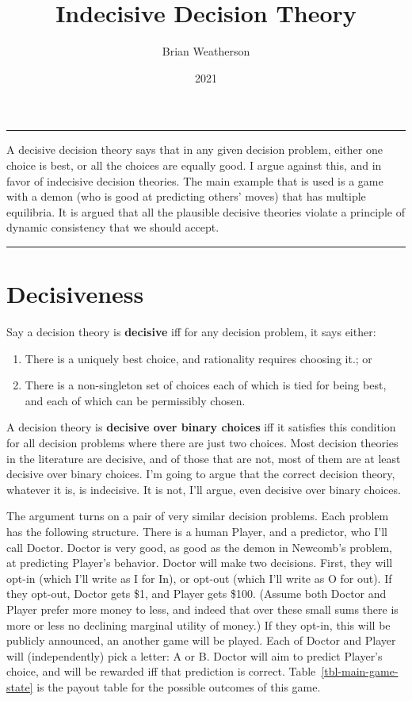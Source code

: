 \documentclass[
  10pt,
  letterpaper,
  DIV=11,
  numbers=noendperiod,
  twoside]{scrartcl}
\title{Indecisive Decision Theory}
\author{Brian Weatherson}
\date{2021}
\providecommand{\tightlist}{%
  \setlength{\itemsep}{0pt}\setlength{\parskip}{0pt}}\usepackage{longtable,booktabs,array}
\renewenvironment{abstract}
 {\vspace{-1.25cm}
 \quotation\small\noindent\rule{\linewidth}{.5pt}\par\smallskip
 \noindent }
 {\par\noindent\rule{\linewidth}{.5pt}\endquotation}
\begin{document}
\maketitle
\begin{abstract}
A decisive decision theory says that in any given decision problem,
either one choice is best, or all the choices are equally good. I argue
against this, and in favor of indecisive decision theories. The main
example that is used is a game with a demon (who is good at predicting
others' moves) that has multiple equilibria. It is argued that all the
plausible decisive theories violate a principle of dynamic consistency
that we should accept.
\end{abstract}

\section{Decisiveness}\label{decisiveness}

Say a decision theory is \textbf{decisive} iff for any decision problem,
it says either:

\begin{enumerate}
\def\labelenumi{\arabic{enumi}.}
\tightlist
\item
  There is a uniquely best choice, and rationality requires choosing
  it.; or
\item
  There is a non-singleton set of choices each of which is tied for
  being best, and each of which can be permissibly chosen.
\end{enumerate}

A decision theory is \textbf{decisive over binary choices} iff it
satisfies this condition for all decision problems where there are just
two choices. Most decision theories in the literature are decisive, and
of those that are not, most of them are at least decisive over binary
choices. I'm going to argue that the correct decision theory, whatever
it is, is indecisive. It is not, I'll argue, even decisive over binary
choices.

The argument turns on a pair of very similar decision problems. Each
problem has the following structure. There is a human Player, and a
predictor, who I'll call Doctor. Doctor is very good, as good as the
demon in Newcomb's problem, at predicting Player's behavior. Doctor will
make two decisions. First, they will opt-in (which I'll write as I for
In), or opt-out (which I'll write as O for out). If they opt-out, Doctor
gets \$1, and Player gets \$100. (Assume both Doctor and Player prefer
more money to less, and indeed that over these small sums there is more
or less no declining marginal utility of money.) If they opt-in, this
will be publicly announced, an another game will be played. Each of
Doctor and Player will (independently) pick a letter: A or B. Doctor
will aim to predict Player's choice, and will be rewarded iff that
prediction is correct. Table~\ref{tbl-main-game-state} is the payout
table for the possible outcomes of this game.
\end{document}
